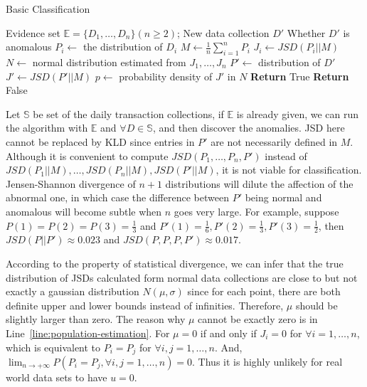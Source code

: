\documentclass[10pt,conference,letterpaper]{IEEEtran}
\begin{document}
			\begin{algorithm}[!t]
				\caption{Basic Classification}
				\label{alg:static}
				\begin{algorithmic}[1]
					\Require Evidence set $\mathbb{E} = \{D_1, \dots, D_n\}(n\ge2)$; New data collection $D'$
					\Ensure Whether $D'$ is anomalous
					\State $P_i \gets$ the distribution of $D_i$
					\EndFor
					\State $M \gets \frac{1}{n}\sum_{i=1}^{n}P_i$\label{line:population-estimation}
					\State $J_i \gets JSD(P_i||M)$
					\EndFor
					\State $N \gets$ normal distribution estimated from $J_1, \dots, J_n$
					\State $P' \gets$ distribution of $D'$
					\State $J' \gets JSD(P'||M)$
					\State $p \gets$ probability density of $J'$ in $N$
					\State \textbf{Return} True
					\Else
					\State \textbf{Return} False
					\EndIf
				\end{algorithmic}
			\end{algorithm}
	
			Let $\mathbb{S}$ be set of the daily transaction collections, if $\mathbb{E}$ is already given, we can run the algorithm with $\mathbb{E}$ and $\forall D \in \mathbb{S}$, and then discover the anomalies. JSD here cannot be replaced by KLD since entries in $P'$ are not necessarily defined in $M$. Although it is convenient to compute $JSD(P_1, \dots, P_n, P')$ instead of $JSD(P_1||M), \dots, JSD(P_n||M), JSD(P'||M)$, it is not viable for classification. Jensen-Shannon divergence of $n+1$ distributions will dilute the affection of the abnormal one, in which case the difference between $P'$ being normal and anomalous will become subtle when $n$ goes very large. For example, suppose $P(1) = P(2) = P(3) = \frac{1}{3}$ and $P'(1) = \frac{1}{6}, P'(2) = \frac{1}{3}, P'(3) = \frac{1}{2}$, then $JSD(P||P') \approx 0.023$ and $JSD(P, P, P, P') \approx 0.017$.
	
			According to the property of statistical divergence, we can infer that the true distribution of JSDs calculated form normal data collections are close to but not exactly a gaussian distribution $N(\mu, \sigma)$ since for each point, there are both definite upper and lower bounds instead of infinities. Therefore, $\mu$ should be slightly larger than zero. The reason why $\mu$ cannot be exactly zero is in Line~\ref{line:population-estimation}.
			For $\mu = 0$ if and only if $J_i = 0$ for $\forall i = 1, \dots, n$, which is equivalent to $P_i = P_j$ for $\forall i, j = 1, \dots, n$. And, $\lim_{n\rightarrow+\infty}P(P_i = P_j,\forall i, j = 1, \dots, n)=0$. Thus it is highly unlikely for real world data sets to have $u=0$.
	
\end{document}

